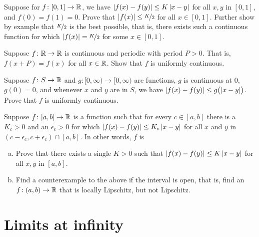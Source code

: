 \begin{exercise}
Suppose for $f \colon [0,1] \to {\mathbb{R}}$, we have $\left\lvert {f(x)-f(y)} \right\rvert \leq K
\left\lvert {x-y} \right\rvert$ for all $x,y$ in $[0,1]$,
and $f(0) = f(1) = 0$.
Prove that $\left\lvert {f(x)} \right\rvert \leq \nicefrac{K}{2}$ for all $x \in [0,1]$.  Further show by example that
$\nicefrac{K}{2}$ is the best possible, that is, there exists such a continuous function
for which $\left\lvert {f(x)} \right\rvert = \nicefrac{K}{2}$ for some $x \in [0,1]$.
\end{exercise}

\begin{exercise}
Suppose $f \colon {\mathbb{R}} \to {\mathbb{R}}$ is continuous and periodic with period
$P > 0$.  That is, $f(x+P) = f(x)$ for all $x \in {\mathbb{R}}$.  Show that $f$
is uniformly continuous.
\end{exercise}

\begin{exercise}
Suppose $f \colon S \to {\mathbb{R}}$ and $g \colon [0,\infty) \to [0,\infty)$
are functions, $g$ is continuous at $0$, $g(0) = 0$, and
whenever $x$ and $y$ are in $S$, we have $\left\lvert {f(x)-f(y)} \right\rvert \leq
g\bigl(\left\lvert {x-y} \right\rvert\bigr)$.
Prove that $f$ is uniformly continuous.
\end{exercise}

\begin{exercise}
Suppose $f \colon [a,b] \to {\mathbb{R}}$ is a function such that for every $c \in
[a,b]$ there is a $K_c > 0$ and an $\epsilon_c > 0$ for which
$\left\lvert {f(x)-f(y)} \right\rvert \leq K_c \left\lvert {x-y} \right\rvert$ for all $x$ and $y$ in
$(c-\epsilon_c,c+\epsilon_c) \cap [a,b]$.  In other words, $f$ is
\begin{enumerate}[a)]
\item
Prove that there exists a single $K > 0$ such that
$\left\lvert {f(x)-f(y)} \right\rvert \leq K \left\lvert {x-y} \right\rvert$ for all $x,y$ in $[a,b]$.
\item
Find a counterexample to the above if the interval is open, that is,
find an $f \colon (a,b) \to {\mathbb{R}}$ that is locally Lipschitz, but not
Lipschitz.
\end{enumerate}
\end{exercise}


\sectionnewpage
\section{Limits at infinity}
\label{sec:limitatinf}


